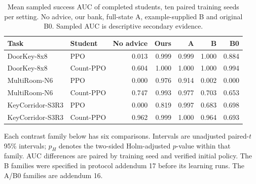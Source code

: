 \begin{table}[htbp]\centering\small

\caption{Mean sampled success AUC of completed students, ten paired training seeds per setting. No advice, our bank, full-state A, example-supplied B and original B0. Sampled AUC is descriptive secondary evidence.}

\label{tab:sampled_controllers}

\begin{tabular}{@{}llrrrrr@{}}\toprule

Task & Student & No advice & Ours & A & B & B0\\\midrule

DoorKey-8x8 & PPO & 0.013 & 0.999 & 0.999 & 1.000 & 0.884\\

DoorKey-8x8 & Count-PPO & 0.604 & 1.000 & 1.000 & 1.000 & 0.994\\

MultiRoom-N6 & PPO & 0.000 & 0.976 & 0.914 & 0.002 & 0.000\\

MultiRoom-N6 & Count-PPO & 0.747 & 0.993 & 0.977 & 0.703 & 0.653\\

KeyCorridor-S3R3 & PPO & 0.000 & 0.819 & 0.997 & 0.683 & 0.698\\

KeyCorridor-S3R3 & Count-PPO & 0.962 & 0.999 & 1.000 & 0.964 & 0.693\\

\bottomrule\end{tabular}\end{table}



Each contrast family below has six comparisons. Intervals are unadjusted
paired-$t$ 95\% intervals; $p_H$ denotes the two-sided Holm-adjusted
$p$-value within that family. AUC differences are paired by training seed
and verified initial policy. The B families were specified in protocol
addendum 17 before its learning runs. The A/B0 families are addendum 16.


